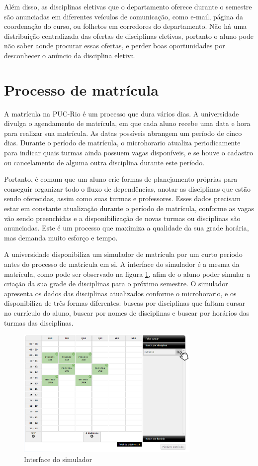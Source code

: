Além disso, as disciplinas eletivas que o departamento oferece durante o semestre são anunciadas em diferentes veículos de comunicação, como e-mail, página da coordenação do curso, ou folhetos em corredores do departamento. Não há uma distribuição centralizada das ofertas de disciplinas eletivas, portanto o aluno pode não saber aonde procurar essas ofertas, e perder boas oportunidades por desconhecer o anúncio da disciplina eletiva.
\section{Processo de matrícula}

A matrícula na PUC-Rio é um processo que dura vários dias. A universidade divulga o agendamento de matrícula, em que cada aluno recebe uma data e hora para realizar sua matrícula. As datas possíveis abrangem um período de cinco dias. Durante o período de matrícula, o microhorario atualiza periodicamente para indicar quais turmas ainda possuem vagas disponíveis, e se houve o cadastro ou cancelamento de alguma outra disciplina durante este período.

Portanto, é comum que um aluno crie formas de planejamento próprias para conseguir organizar todo o fluxo de dependências, anotar as disciplinas que estão sendo oferecidas, assim como suas turmas e professores. Esses dados precisam estar em constante atualização durante o período de matrícula, conforme as vagas vão sendo preenchidas e a disponibilização de novas turmas ou disciplinas são anunciadas. Este é um processo que maximiza a qualidade da sua grade horária, mas demanda muito esforço e tempo. 

A universidade disponibiliza um simulador de matrícula por um curto período antes do processo de matrícula em si. A interface do simulador é a mesma da matrícula, como pode ser observado na figura \ref{fig:simulador}, 
afim de o aluno poder simular a criação da sua grade de disciplinas para o próximo semestre. O simulador apresenta os dados das disciplinas atualizados conforme o microhorario, e os disponibiliza de três formas diferentes: buscas por disciplinas que faltam cursar no currículo do aluno, buscar por nomes de disciplinas e buscar por horários das turmas das 
disciplinas.\cite{doc-matricula}

\begin{figure}[!ht]
  \begin{center}
  \includegraphics[width=250pt]{figuras/simulador}
  \caption{Interface do simulador}
  \label{fig:simulador}
  \end{center}
\end{figure}

